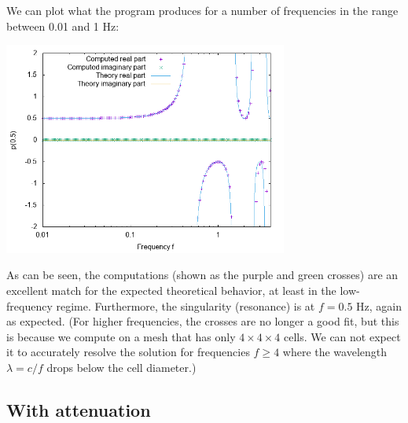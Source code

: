 \documentclass{article}
\begin{document}
We can plot what the program produces for a number of frequencies in
the range between 0.01 and 1 Hz:
%
%

\begin{center}
\includegraphics[width=0.7\textwidth]{unit-cube/no-attenuation/pressure-at-center.png}
\end{center}

As can be seen, the computations (shown as the purple and green crosses)
are an excellent match for the expected theoretical behavior, at least
in the low-frequency regime. Furthermore, the singularity (resonance)
is at $f=0.5$ Hz, again as expected. (For higher frequencies, the
crosses are no longer a good fit, but this is because we compute on a
mesh that has only $4\times 4\times 4$ cells. We can not expect it to
accurately resolve the solution for frequencies $f\ge 4$ where the
wavelength $\lambda=c/f$ drops below the cell diameter.)


\subsection{With attenuation}
\end{document}
